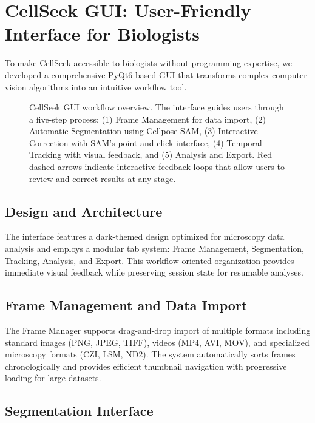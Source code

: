 \documentclass[../cellseek_paper.tex]{subfiles}
\begin{document}
\section{CellSeek GUI: User-Friendly Interface for Biologists}

To make CellSeek accessible to biologists without programming expertise, we developed a comprehensive PyQt6-based GUI that transforms complex computer vision algorithms into an intuitive workflow tool.

\begin{figure}[htbp]
  \centering
  
  \caption{CellSeek GUI workflow overview. The interface guides users through a five-step process: (1) Frame Management for data import, (2) Automatic Segmentation using Cellpose-SAM, (3) Interactive Correction with SAM's point-and-click interface, (4) Temporal Tracking with visual feedback, and (5) Analysis and Export. Red dashed arrows indicate interactive feedback loops that allow users to review and correct results at any stage.}
  \label{fig:gui_workflow}
\end{figure}

\subsection{Design and Architecture}

The interface features a dark-themed design optimized for microscopy data analysis and employs a modular tab system: Frame Management, Segmentation, Tracking, Analysis, and Export. This workflow-oriented organization provides immediate visual feedback while preserving session state for resumable analyses.

\subsection{Frame Management and Data Import}

The Frame Manager supports drag-and-drop import of multiple formats including standard images (PNG, JPEG, TIFF), videos (MP4, AVI, MOV), and specialized microscopy formats (CZI, LSM, ND2). The system automatically sorts frames chronologically and provides efficient thumbnail navigation with progressive loading for large datasets.

\subsection{Segmentation Interface}
\end{document}

